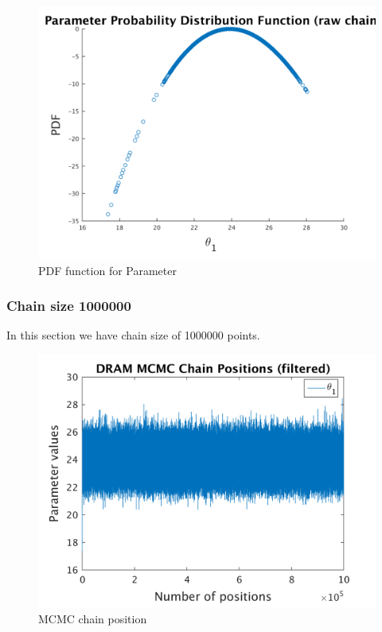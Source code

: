 \begin{figure}[H]
  
  \centering
   \includegraphics[scale=0.75]{100_results/outputData_900000/ip_logLike_unified}
   \caption{PDF function for Parameter }
\end{figure}


\subsubsection{Chain size 1000000 }
In this section we have chain size of 1000000 points. 

\begin{figure}[H]
  
  \centering
   \includegraphics[scale=0.75]{100_results/outputData_1000000/simple_ip_chain_pos_filt}
   \caption{MCMC chain position }
\end{figure}


